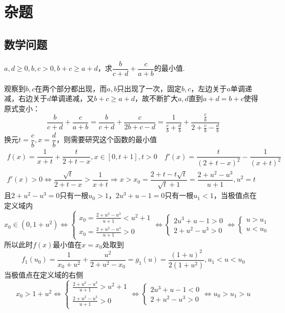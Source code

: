 \chapter{杂题}
\section{数学问题}
\newpage
\begin{example}{}{}
    $a,d\geq 0,b,c>0,b+c\geq a+d$，求$\dfrac{b}{c+d}+\dfrac{c}{a+b}$的最小值.
\end{example}
\begin{solution}
    观察到$b,c$在两个部分都出现，而$a,b$只出现了一次，固定$b,c$，左边关于$a$单调递减，右边关于$d$单调递减，又$b+c\geq a+d$，故不断扩大$a,d$直到$a+d=b+c$使得原式变小：
    \[\dfrac{b}{c+d}+\dfrac{c}{a+b}=\dfrac{b}{c+d}+\dfrac{c}{2b+c-d}=\dfrac{1}{\frac{c}{b}+\frac{d}{b}}+\dfrac{\frac{c}{b}}{2+\frac{c}{b}-\frac{d}{b}}\]
    换元$t=\dfrac{c}{b},x=\dfrac{d}{b}$，则需要研究这个函数的最小值
    \begin{align*}f(x)=\dfrac{1}{x+t}+\dfrac{t}{2+t-x},x\in[0,t+1],t>0\quad
        f'(x)=\dfrac{t}{(2+t-x)^2}-\dfrac{1}{(x+t)^2}\\
        f'(x)>0\Leftrightarrow \dfrac{\sqrt{t}}{2+t-x}>\dfrac{1}{x+t}
        \Rightarrow x>x_0=\dfrac{2+t-t\sqrt{t}}{\sqrt{t}+1}=\dfrac{2+u^2-u^3}{u+1},u^2=t
    \end{align*}
    且$2+u^2-u^3=0$只有一根$u_0>1$，$ 2u^3+u-1=0$只有一根$u_1<1$，当极值点在定义域内
    \[x_0\in(0,1+u^2)\Leftrightarrow\begin{cases}x_0=\frac{2+u^2-u^3}{u+1}<u^2+1\\x_0=\frac{2+u^2-u^3}{u+1}>0\end{cases}\Leftrightarrow\begin{cases}2u^3+u-1>0\\2+u^2-u^3>0\end{cases}\Leftrightarrow \begin{cases}u>u_1\\u<u_0\end{cases}\]
    所以此时$f(x)$最小值在$x=x_0$处取到
    \[f_1(u_0)=\dfrac{1}{x_0+u^2}+\dfrac{u^2}{2+u^2-x_0}=g_1(u)=\dfrac{(1+u)^2}{2(1+u^2)},u_1<u<u_0\]
    当极值点在定义域的右侧
    \[x_0>1+u^2\Leftrightarrow\begin{cases}\frac{2+u^2-u^3}{u+1}>u^2+1\\\frac{2+u^2-u^3}{u+1}>0\end{cases}\Leftrightarrow \begin{cases}2u^3+u-1<0\\2+u^2-u^3>0\end{cases}\Leftrightarrow u_0>u_1>u\]

\end{solution}
